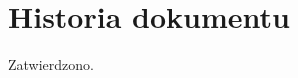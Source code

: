 \documentclass[10pt]{dokument-tiwo}
\begin{document}
\section{Historia dokumentu}
\begin{versions}
        Zatwierdzono.
\end{versions}
\end{document}
